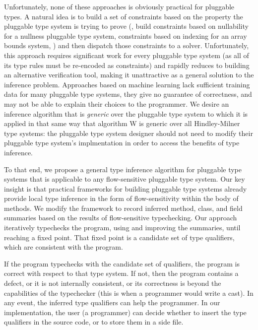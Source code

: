 Unfortunately, none of these approaches is obviously practical for pluggable types.
A natural idea is to build a set of constraints based on the property the
pluggable type system is trying to prove (\eg, build constraints based on
nullability for a nullness pluggable type system, constraints based on indexing
for an array bounds system, \etc) and then dispatch those constraints
to a solver.
%
Unfortunately, this approach requires significant work for every pluggable type
system (as all of its type rules must be re-encoded as constraints) and rapidly
reduces to building an alternative verification tool, making it unattractive as
a general solution to the inference problem.
%
Approaches based on machine learning lack sufficient training data for
many pluggable type systems, they give no guarantee of correctness, and may
not be able to explain their choices to the programmer.
%
We desire an
inference algorithm that is \emph{generic} over the pluggable type system
to which it is applied in that same way that algorithm W is generic over
all Hindley-Milner type systems: the pluggable type system designer should not need to
modify their pluggable type system's implmentation in order to access
the benefits of type inference.

To that end, we propose a general type inference algorithm for pluggable type
systems that is applicable to any flow-sensitive pluggable type system.
Our key insight is that
practical frameworks for building pluggable type systems already provide
local type inference in the form of flow-sensitivity within the body
of methods.
We modify the framework to record inferred method, class, and field summaries
based on the results of flow-sensitive typechecking.
Our approach iteratively typechecks the program, using and improving the
summaries, until reaching a fixed point.
That fixed point is a candidate set of type qualifiers, which are
consistent with the program.

If the program typechecks with the candidate set of qualifiers, the program
is correct with respect to that type system.
If not, then the program contains a defect, or it is not internally
consistent, or its correctness is beyond the capabilities of the
typechecker (this is when a programmer would write a cast).
In any event, the inferred type qualifiers can help the programmer.
In our implementation, the user (a programmer) can decide whether to insert
the type qualifiers in the source code, or to store them in a side file.

